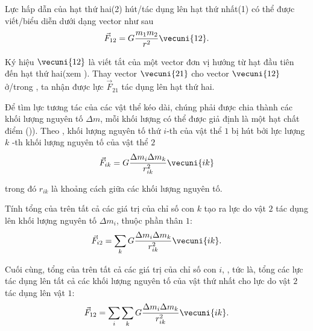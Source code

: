 Lực hấp dẫn của hạt thứ hai(2) hút/tác dụng lên hạt thứ nhất(1) có thể được viết/biểu diễn dưới dạng vector như sau
\begin{equation}\label{eq:6_2}
	\vec{F}_{12} = G\frac{m_1m_2}{r^2}\vecuni{12}.
\end{equation}

Ký hiệu $\vecuni{12}$ là viết tắt của một vector đơn vị hướng từ hạt đầu tiên đến hạt thứ hai(xem ). Thay vector $\vecuni{21}$ cho vector $\vecuni{12}$ ở/trong , ta nhận được lực $\vec{F}_{21}$ tác dụng lên hạt thứ hai.

Để tìm lực tương tác của các vật thể kéo dài, chúng phải được chia thành các khối lượng nguyên tố $\Delta m$, mỗi khối lượng có thể được giả định là một hạt chất điểm ()). Theo , khối lượng nguyên tố thứ $i$-th của vật thể $1$ bị hút bởi lực lượng $k$ -th khối lượng nguyên tố của vật thể $2$
\begin{equation}\label{eq:6_3}
	\vec{F}_{ik} = G\frac{\Delta m_i\Delta m_k}{r_{ik}^2}\vecuni{ik}
\end{equation}

\noindent
trong đó $r_{ik}$ là khoảng cách giữa các khối lượng nguyên tố.

Tính tổng của  trên tất cả các giá trị của chỉ số con $k$ tạo ra lực do vật $2$ tác dụng lên khối lượng nguyên tố $\Delta m_i$, thuộc phần thân $1$:
\begin{equation}\label{eq:6_4}
	\vec{F}_{i2} = \sum_k G\frac{\Delta m_i\Delta m_k}{r_{ik}^2}\vecuni{ik}.
\end{equation}

\noindent
Cuối cùng, tổng của  trên tất cả các giá trị của chỉ số con $i$, \ie, tức là, tổng các lực tác dụng lên tất cả các khối lượng nguyên tố của vật thứ nhất cho lực do vật $2$ tác dụng lên vật $1$:
\begin{equation}\label{eq:6_5}
	\vec{F}_{12} = \sum_i \sum_k G\frac{\Delta m_i\Delta m_k}{r_{ik}^2}\vecuni{ik}.
\end{equation}


